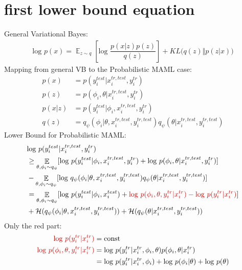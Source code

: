 \documentclass{article}
\DeclareMathOperator*{\expected}{\mathbb{E}}
\begin{document}
	\section{first lower bound equation}
	General Variational Bayes:
	\begin{align}
		\text{log } p(x) = \expected_{z \sim q}[\text{log } \dfrac{p(x \vert z)p(z)}{q(z)}] + KL \big(q(z) \Vert p(z \vert x)\big)
	\end{align}
	Mapping from general VB to the Probabilistic MAML case:
	\begin{align}
		p(x) &= p(y_i^{test} \vert x_i^{tr, test}, y_i^{tr}) \\
		p(z) &= p(\phi_i, \theta \vert x_i^{tr,test}, y_i^{tr}) \\
		p(x \vert z) &= p(y_i^{test} \vert \phi_i, x_i^{tr, test}, y_i^{tr})\\
		q(z) &= q_{\psi}(\phi_i \vert \theta, x_i^{tr,test}, y_i^{tr,test}) q_{\psi}(\theta \vert x_i^{tr,test}, y_i^{tr,test})
	\end{align}
	Lower Bound for Probabilistic MAML:
	\begin{align}
		&\text{log } p(y_i^{test} \vert x_i^{tr, test}, y_i^{tr}) \\ 
		&\ge  \expected_{\theta, \phi_i \sim q_{\psi}}[\text{log } p(y_i^{test} \vert \phi_i, x_i^{tr, test}, y_i^{tr}) + \text{log }p(\phi_i, \theta \vert x_i^{tr,test}, y_i^{tr})] \\
		&- \expected_{\theta, \phi_i \sim q_{\psi}}[  \text{log }q_{\psi}(\phi_i \vert \theta, x_i^{tr,test}, y_i^{tr,test}) q_{\psi}(\theta \vert x_i^{tr,test}, y_i^{tr,test})]  \\
		&= \expected_{\theta, \phi_i \sim q_{\psi}}[ \text{log } p(y_i^{test} \vert \phi_i, x_i^{test}) + \textcolor{bostonuniversityred}{ \text{log }p(\phi_i, \theta, y_i^{tr} \vert x_i^{tr}) - \text{log } p(y_i^{tr} \vert x_i^{tr})}] \\
		&+ \mathcal{H}(q_{\psi}(\phi_i \vert \theta, x_i^{tr,test}, y_i^{tr,test})) + \mathcal{H}( q_{\psi}(\theta \vert x_i^{tr,test}, y_i^{tr,test})) 
	\end{align}
	Only the red part:
	\begin{align}
		\textcolor{bostonuniversityred}{\text{log } p(y_i^{tr} \vert x_i^{tr})} &= \text{const} \\
		\textcolor{bostonuniversityred}{\text{log }p(\phi_i, \theta, y_i^{tr} \vert x_i^{tr})} &= \text{log } p(y_i^{tr} \vert x_i^{tr}, \phi_i, \theta)p(\phi_i, \theta \vert x_i^{tr}) \\
		&= \text{log } p(y_i^{tr} \vert x_i^{tr}, \phi_i) + \text{log }p(\phi_i \vert \theta) + \text{log } p(\theta)
	\end{align}
	
\end{document}
